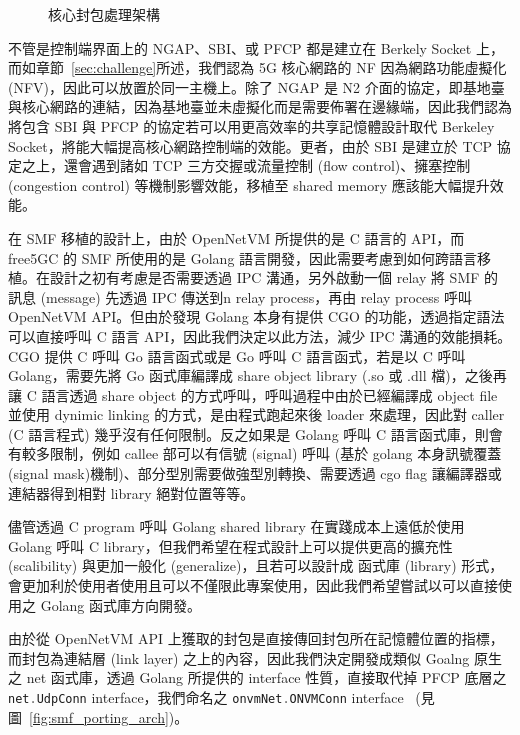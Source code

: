 \begin{figure}[htbp]
    \caption[核心封包處理架構]{{\footnotesize 核心封包處理架構}}
    \label{fig:kernel_packet_processing_arch}
\end{figure}

不管是控制端界面上的 NGAP、SBI、或 PFCP 都是建立在 Berkely Socket 上，而如章節~\ref{sec:challenge}所述，我們認為 5G 核心網路的 NF 因為網路功能虛擬化 (NFV)，因此可以放置於同一主機上。除了 NGAP 是 N2 介面的協定，即基地臺與核心網路的連結，因為基地臺並未虛擬化而是需要佈署在邊緣端，因此我們認為將包含 SBI 與 PFCP 的協定若可以用更高效率的共享記憶體設計取代 Berkeley Socket，將能大幅提高核心網路控制端的效能。更者，由於 SBI 是建立於 TCP 協定之上，還會遇到諸如 TCP 三方交握或流量控制 (flow control)、擁塞控制 (congestion control) 等機制影響效能，移植至 shared memory 應該能大幅提升效能。


在 SMF 移植的設計上，由於 OpenNetVM 所提供的是 C 語言的 API，而 free5GC 的 SMF 所使用的是 Golang 語言開發，因此需要考慮到如何跨語言移植。在設計之初有考慮是否需要透過 IPC 溝通，另外啟動一個 relay 將 SMF 的訊息 (message) 先透過 IPC 傳送到n relay process，再由 relay process 呼叫 OpenNetVM API。但由於發現 Golang 本身有提供 CGO 的功能，透過指定語法可以直接呼叫 C 語言 API，因此我們決定以此方法，減少 IPC 溝通的效能損耗。CGO 提供 C 呼叫 Go 語言函式或是 Go 呼叫 C 語言函式，若是以 C 呼叫 Golang，需要先將 Go 函式庫編譯成 share object library (.so 或 .dll 檔)，之後再讓 C 語言透過 share object 的方式呼叫，呼叫過程中由於已經編譯成 object file 並使用 dynimic linking 的方式，是由程式跑起來後 loader 來處理，因此對 caller (C 語言程式) 幾乎沒有任何限制。反之如果是 Golang 呼叫 C 語言函式庫，則會有較多限制，例如 callee 部可以有信號 (signal) 呼叫 (基於 golang 本身訊號覆蓋(signal mask)機制)、部分型別需要做強型別轉換、需要透過 cgo flag 讓編譯器或連結器得到相對 library 絕對位置等等。

儘管透過 C program 呼叫 Golang shared library 在實踐成本上遠低於使用 Golang 呼叫 C library，但我們希望在程式設計上可以提供更高的擴充性 (scalibility) 與更加一般化 (generalize)，且若可以設計成 函式庫 (library) 形式，會更加利於使用者使用且可以不僅限此專案使用，因此我們希望嘗試以可以直接使用之 Golang 函式庫方向開發。

由於從 OpenNetVM API 上獲取的封包是直接傳回封包所在記憶體位置的指標，而封包為連結層 (link layer) 之上的內容，因此我們決定開發成類似 Goalng 原生之 net 函式庫，透過 Golang 所提供的 interface 性質，直接取代掉 PFCP 底層之 \lstinline[language=Go]{net.UdpConn} interface，我們命名之 \lstinline[language=Go]{onvmNet.ONVMConn} interface~\cite{github.onvmNet} (見圖~\ref{fig:smf_porting_arch})。


